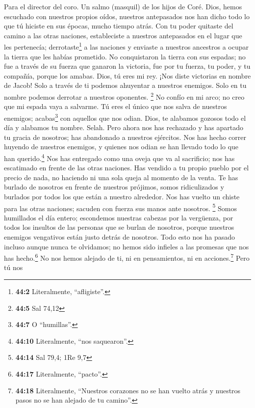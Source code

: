 Para el director del coro. Un salmo (masquil) de los hijos de Coré.
 Dios, hemos escuchado con nuestros propios oídos,
nuestros antepasados nos han dicho todo lo que tú hiciste en sus épocas,
mucho tiempo atrás.  Con tu poder quitaste del camino a
las otras naciones, estableciste a nuestros antepasados en el lugar que
les pertenecía; derrotaste\footnote{\textbf{44:2} Literalmente,
  ``afligiste''.} a las naciones y enviaste a nuestros ancestros a
ocupar la tierra que les habías prometido.  No
conquistaron la tierra con sus espadas; no fue a través de su fuerza que
ganaron la victoria, fue por tu fuerza, tu poder, y tu compañía, porque
los amabas.  Dios, tú eres mi rey. ¡Nos diste victorias en
nombre de Jacob!  Solo a través de ti podemos ahuyentar a
nuestros enemigos. Solo en tu nombre podemos derrotar a nuestros
oponentes. \footnote{\textbf{44:5} Sal 74,12}  No confío
en mi arco; no creo que mi espada vaya a salvarme.  Tú
eres el único que nos salva de nuestros enemigos; acabas\footnote{\textbf{44:7}
  O ``humillas''.} con aquellos que nos odian.  Dios, te
alabamos gozosos todo el día y alabamos tu nombre. Selah. 
Pero ahora nos has rechazado y has apartado tu gracia de nosotros; has
abandonado a nuestros ejércitos.  Nos has hecho correr
huyendo de nuestros enemigos, y quienes nos odian se han llevado todo lo
que han querido.\footnote{\textbf{44:10} Literalmente, ``nos
  saquearon''.}  Nos has entregado como una oveja que va
al sacrificio; nos has escatimado en frente de las otras naciones.
 Has vendido a tu propio pueblo por el precio de nada, no
haciendo ni una sola queja al momento de la venta.  Te
has burlado de nosotros en frente de nuestros prójimos, somos
ridiculizados y burlados por todos los que están a nuestro alrededor.
 Nos has vuelto un chiste para las otras naciones;
sacuden con fuerza sus manos ante nosotros. \footnote{\textbf{44:14} Sal
  79,4; 1Re 9,7}  Somos humillados el día entero;
escondemos nuestras cabezas por la vergüenza,  por todos
los insultos de las personas que se burlan de nosotros, porque nuestros
enemigos vengativos están justo detrás de nosotros.  Todo
esto nos ha pasado incluso aunque nunca te olvidamos; no hemos sido
infieles a las promesas que nos has hecho.\footnote{\textbf{44:17}
  Literalmente, ``pacto''.}  No nos hemos alejado de ti,
ni en pensamientos, ni en acciones.\footnote{\textbf{44:18}
  Literalmente, ``Nuestros corazones no se han vuelto atrás y nuestros
  pasos no se han alejado de tu camino''.}  Pero tú nos
